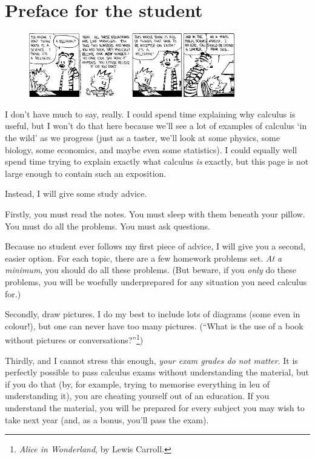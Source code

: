 \documentclass[a4paper]{memoir}
\theoremstyle{definition}
\begin{document}
\chapter{Preface for the student}
\begin{figure}
  \centering
  \includegraphics[width=0.8\textwidth]{hobbes}
\end{figure}
I don't have much to say, really. I could spend time explaining why calculus is useful, but I won't do that here because we'll see
a lot of examples of calculus `in the wild' as we progress (just as a taster, we'll look at some physics, some biology, some economics,
and maybe even some statistics). I could equally well spend time trying to explain exactly what calculus \emph{is} exactly, but this
page is not large enough to contain such an exposition.

Instead, I will give some study advice.

Firstly, you must read the notes. You must sleep with them beneath your pillow. You must do all the problems. You must ask questions.

Because no student ever follows my first piece of advice, I will give you a second, easier option. For each topic, there are a few
homework problems set. \emph{At a minimum}, you should do all these problems. (But beware, if you \emph{only} do these problems, you
will be woefully underprepared for any situation you need calculus for.)

Secondly, draw pictures. I do my best to include lots of diagrams (some even in colour!), but one can never have too many pictures.
(``What is the use of a book without pictures or conversations?''\footnote{\emph{Alice in Wonderland}, by Lewis Carroll.})

Thirdly, and I cannot stress this enough, \emph{your exam grades do not matter}. It is perfectly possible to pass calculus exams
without understanding the material, but if you do that (by, for example, trying to memorise everything in leu of understanding it),
you are cheating yourself out of an education. If you understand the material, you will be prepared for every subject you may wish
to take next year (and, as a bonus, you'll pass the exam).
\end{document}
